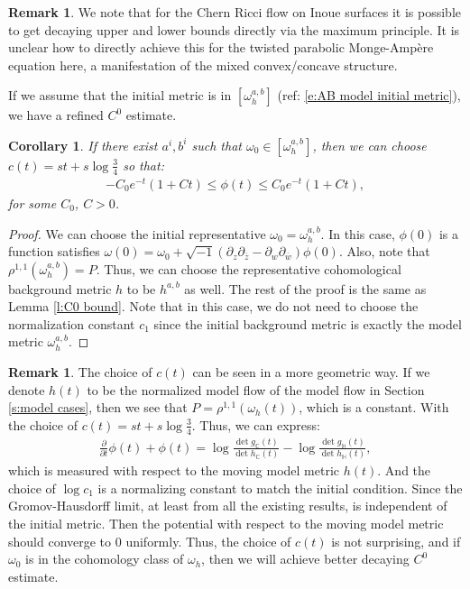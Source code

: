 \documentclass[12pt]{amsart}
\numberwithin{equation}{section}
\newtheorem{cor}[prop]{Corollary}
\numberwithin{prop}{section}
\theoremstyle{definition}
\newtheorem{rmk}[prop]{Remark}
\renewcommand{\bar}[1]{\overline{#1}}
\begin{document}
\begin{rmk}\label{sign} We note that for the  Chern Ricci flow on Inoue surfaces \cite{FTWZ} it is possible to get decaying upper and lower bounds directly via the maximum principle.  It is unclear how to directly achieve this for the twisted parabolic Monge-Amp\`ere equation here, a manifestation of the mixed convex/concave structure.
\end{rmk}

If we assume that the initial metric is in $[\omega^{a,b}_h]$ (ref: \eqref{e:AB model initial metric}), we have a refined $C^0$ estimate.
\begin{cor}\label{c:imporved C0}
    If there exist $a^i, b^i$ such that $\omega_0\in[\omega^{a,b}_h]$, then we can choose $c(t) = st+s\operatorname{log}\frac{3}{4}$ so that:
    \begin{align*}
        -C_0e^{-t}(1+Ct)\leq\phi(t)\leq C_0 e^{-t}(1+Ct),
    \end{align*}
    for some $C_0$, $C>0$.
\end{cor}
\begin{proof}
    We can choose the initial representative $\omega_0 = \omega^{a,b}_h$. In this case, $\phi(0)$ is a function satisfies $\omega(0)=\omega_0 +\sqrt{-1}(\partial_z\partial_{\bar{z}} - \partial_w \partial_{\bar{w}})\phi(0)$. Also, note that $\rho^{1,1}(\omega^{a,b}_h) = P$. Thus, we can choose the representative cohomological background metric $h$ to be $h^{a,b}$ as well. The rest of the proof is the same as Lemma \ref{l:C0 bound}. Note that in this case, we do not need to choose the normalization constant $c_1$ since the initial background metric is exactly the model metric $\omega^{a,b}_h$.
\end{proof}
\begin{rmk}
    The choice of $c(t)$ can be seen in a more geometric way. If we denote $h(t)$ to be the normalized model flow of the model flow in Section \ref{s:model cases}, then we see that $P = \rho^{1,1}(\omega_h(t))$, which is a constant. With the choice of $c(t) = st+s\log{\frac{3}{4}}$. Thus, we can express:
    \begin{align*}
        \frac{\partial}{\partial t}\phi(t)+\phi(t)=\operatorname{log}\frac{\operatorname{det}g_\mathbb{C}(t)}{\operatorname{det}h_\mathbb{C}(t)}-\operatorname{log}\frac{\operatorname{det}g_\mathbb{H}(t)}{\operatorname{det}h_\mathbb{H}(t)},
    \end{align*}
    which is measured with respect to the moving model metric $h(t)$. And the choice of $\log c_1$ is a normalizing constant to match the initial condition. Since the Gromov-Hausdorff limit, at least from all the existing results, is independent of the initial metric. Then the potential with respect to the moving model metric should converge to 0 uniformly. Thus, the choice of $c(t)$ is not surprising, and if $\omega_0$ is in the cohomology class of $\omega_h$, then we will achieve better decaying $C^0$ estimate.
\end{rmk}
\end{document}
